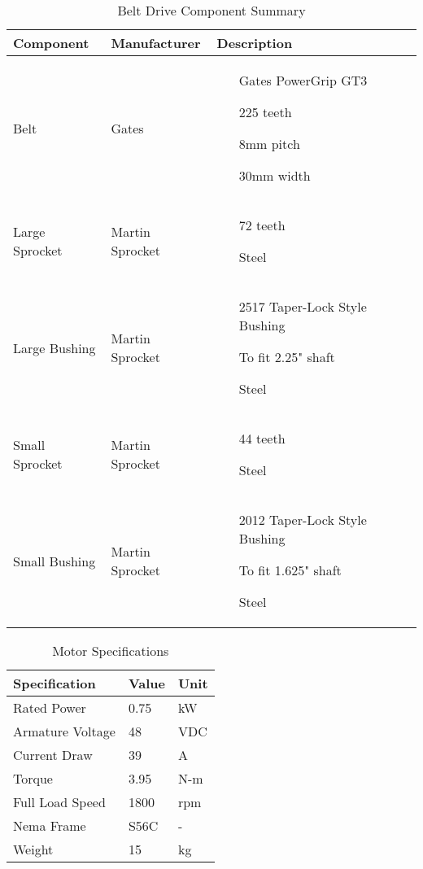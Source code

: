  \begin{table}[htbp]
 	\centering
 	\caption{Belt Drive Component Summary}
 	\begin{tabular}{| lll |} \hline
 		Component & Manufacturer & Description \\ \hline
 		Belt & Gates & \begin{itemize}\item[Gates PowerGrip GT3]\item[225 teeth]\item[8mm pitch]\item[30mm width]
 		\end{itemize} \\
 		Large Sprocket & Martin Sprocket & \begin{itemize}\item[72 teeth]\item[Steel]\end{itemize} \\
 		Large Bushing & Martin Sprocket & \begin{itemize}\item[2517 Taper-Lock Style Bushing]\item[To fit 2.25" shaft]\item[Steel]
 		\end{itemize} \\
 		Small Sprocket & Martin Sprocket & \begin{itemize}\item[44 teeth]\item[Steel]\end{itemize} \\
 		Small Bushing & Martin Sprocket & \begin{itemize}\item[2012 Taper-Lock Style Bushing]\item[To fit 1.625" shaft]\item[Steel]
 		\end{itemize} \\ 
 	\end{tabular}
 	\label{tab:drive_comp}
 \end{table}


  \begin{table}[htbp]
 \centering
 \caption{Motor Specifications}
 \begin{tabular}{| lll |} \hline
 Specification & Value & Unit \\ \hline
Rated Power & 0.75 & kW \\
Armature Voltage & 48 & VDC \\
Current Draw & 39 & A \\
Torque & 3.95 & N-m \\
Full Load Speed & 1800 & rpm \\
Nema Frame & S56C & - \\
Weight & 15 & kg \\ \hline
 \end{tabular}
 \label{tab:motor_spec}
 \end{table}
 
 